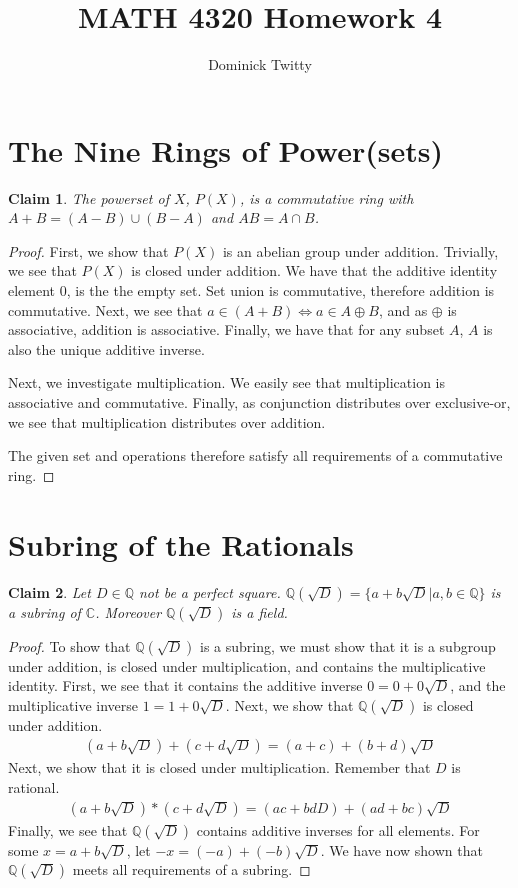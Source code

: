 \documentclass[12pt]{article}
\newtheorem*{claim*}{Claim}
\begin{document}
\title{MATH 4320 Homework 4}
\author{Dominick Twitty}
\date{}
\maketitle

\section{The Nine Rings of Power(sets)}
\begin{claim*}
The powerset of $X$, $P(X)$, is a commutative ring with $A + B = (A - B) \cup (B - A)$ and $AB = A \cap B$.
\end{claim*}
\begin{proof}
First, we show that $P(X)$ is an abelian group under addition. Trivially, we see that $P(X)$ is closed under addition. We have that the additive identity element $0$, is the the empty set. Set union is commutative, therefore addition is commutative. Next, we see that $a \in (A + B) \iff a \in A \oplus B$, and as $\oplus$ is associative, addition is associative. Finally, we have that for any subset $A$, $A$ is also the unique additive inverse.

Next, we investigate multiplication. We easily see that multiplication is associative and commutative. Finally, as conjunction distributes over exclusive-or, we see that multiplication distributes over addition.

The given set and operations therefore satisfy all requirements of a commutative ring.
\end{proof}

\section{Subring of the Rationals}
\begin{claim*}
Let $D \in \mathbb{Q}$ not be a perfect square. $\mathbb{Q}(\sqrt{D}) = \{a + b\sqrt{D} | a, b \in \mathbb{Q}\}$ is a subring of $\mathbb{C}$. Moreover $\mathbb{Q}(\sqrt{D})$ is a field.  
\end{claim*}
\begin{proof}
To show that $\mathbb{Q}(\sqrt{D})$ is a subring, we must show that it is a subgroup under addition, is closed under multiplication, and contains the multiplicative identity. First, we see that it contains the additive inverse $0 = 0 + 0\sqrt{D}$, and the multiplicative inverse $1 = 1 + 0\sqrt{D}$. Next, we show that $\mathbb{Q}(\sqrt{D})$ is closed under addition.
\begin{align*}
(a + b\sqrt{D}) + (c + d\sqrt{D}) = (a + c) + (b + d)\sqrt{D}
\end{align*}
Next, we show that it is closed under multiplication. Remember that $D$ is rational.
\begin{align*}
(a + b\sqrt{D}) * (c + d\sqrt{D}) = (ac + bdD) + (ad + bc)\sqrt{D}
\end{align*}
Finally, we see that $\mathbb{Q}(\sqrt{D})$ contains additive inverses for all elements. For some $x = a + b\sqrt{D}$, let $-x = (-a) + (-b)\sqrt{D}$. We have now shown that $\mathbb{Q}(\sqrt{D})$ meets all requirements of a subring.
\end{proof}
\end{document}
